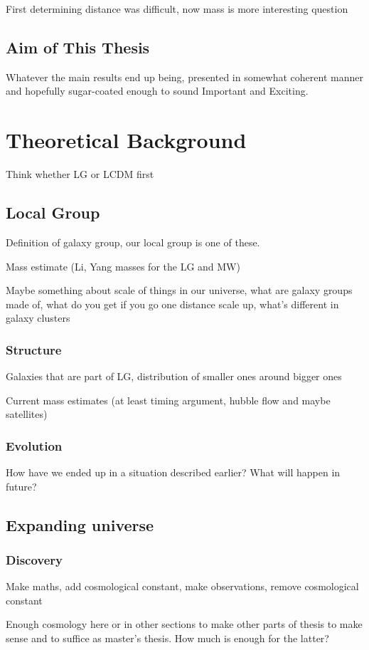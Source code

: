 \documentclass[english, oneside]{HYgradu}
\begin{document}
First determining distance was difficult, now mass is more interesting question

\section{Aim of This Thesis}
Whatever the main results end up being, presented in somewhat coherent manner and hopefully sugar-coated enough to sound Important and Exciting.


\chapter{Theoretical Background}
Think whether LG or LCDM first
\section{Local Group}
Definition of galaxy group, our local group is one of these.

Mass estimate (Li, Yang masses for the LG and MW)

Maybe something about scale of things in our universe, what are galaxy groups made of, what do you get if you go one distance scale up, what's different in galaxy clusters
\subsection{Structure}
Galaxies that are part of LG, distribution of smaller ones around bigger ones

Current mass estimates (at least timing argument, hubble flow and maybe satellites)

\subsection{Evolution}
How have we ended up in a situation described earlier? What will happen in future?


\section{Expanding universe}
\subsection{Discovery}
Make maths, add cosmological constant, make observations, remove cosmological constant

Enough cosmology here or in other sections to make other parts of thesis to make sense and to suffice as master's thesis. How much is enough for the latter?
\end{document}

